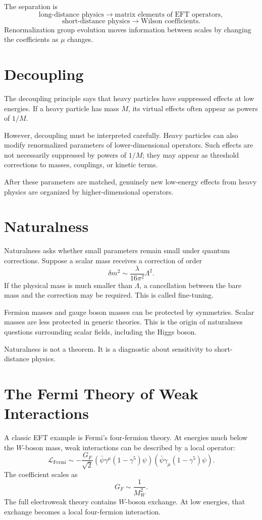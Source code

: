 The separation is
\[
    \text{long-distance physics} \longrightarrow \text{matrix elements of EFT operators},
\]
\[
    \text{short-distance physics} \longrightarrow \text{Wilson coefficients}.
\]
Renormalization group evolution moves information between scales by changing the
coefficients as \(\mu\) changes.

\section{Decoupling}

The decoupling principle says that heavy particles have suppressed effects at low
energies. If a heavy particle has mass \(M\), its virtual effects often appear as
powers of \(1/M\).

However, decoupling must be interpreted carefully. Heavy particles can also
modify renormalized parameters of lower-dimensional operators. Such effects are
not necessarily suppressed by powers of \(1/M\); they may appear as threshold
corrections to masses, couplings, or kinetic terms.

After these parameters are matched, genuinely new low-energy effects from heavy
physics are organized by higher-dimensional operators.

\section{Naturalness}

Naturalness asks whether small parameters remain small under quantum corrections.
Suppose a scalar mass receives a correction of order
\[
    \delta m^2\sim \frac{\lambda}{16\pi^2}\Lambda^2.
\]
If the physical mass is much smaller than \(\Lambda\), a cancellation between the
bare mass and the correction may be required. This is called fine-tuning.

Fermion masses and gauge boson masses can be protected by symmetries. Scalar
masses are less protected in generic theories. This is the origin of naturalness
questions surrounding scalar fields, including the Higgs boson.

Naturalness is not a theorem. It is a diagnostic about sensitivity to short-
distance physics.

\section{The Fermi Theory of Weak Interactions}

A classic EFT example is Fermi's four-fermion theory. At energies much below the
\(W\)-boson mass, weak interactions can be described by a local operator:
\[
    \mathcal{L}_{\mathrm{Fermi}}
    \sim -\frac{G_F}{\sqrt{2}}(\bar\psi\gamma^\mu(1-\gamma^5)\psi)
    (\bar\psi\gamma_\mu(1-\gamma^5)\psi).
\]
The coefficient scales as
\[
    G_F\sim \frac{1}{M_W^2}.
\]
The full electroweak theory contains \(W\)-boson exchange. At low energies,
that exchange becomes a local four-fermion interaction.

